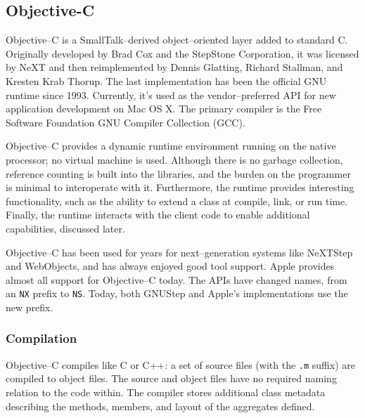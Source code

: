 \subsection{Objective-C}
	Objective--C\cite{objc} is a SmallTalk--derived object--oriented layer added to standard C.  Originally developed by Brad Cox and the StepStone Corporation\cite{dekorte}, it was licensed by NeXT and then reimplemented by Dennis Glatting, Richard Stallman, and Kresten Krab Thorup.  The last implementation has been the official GNU runtime since 1993\cite{dekorte}.  Currently, it's used as the vendor--preferred API for new application development on Mac OS X.  The primary compiler is the Free Software Foundation GNU Compiler Collection (GCC).

	Objective--C provides a dynamic runtime environment running on the native processor; no virtual machine is used.  Although there is no garbage collection, reference counting is built into the libraries, and the burden on the programmer is minimal to interoperate with it.  Furthermore, the runtime provides interesting functionality, such as the ability to extend a class at compile, link, or run time.  Finally, the runtime interacts with the client code to enable additional capabilities, discussed later.

	Objective--C has been used for years for next--generation systems like NeXTStep and WebObjects, and has always enjoyed good tool support.  Apple provides almost all support for Objective--C today.  The APIs have changed names, from an \texttt{NX} prefix to \texttt{NS}.  Today, both GNUStep\cite{gnustep} and Apple's implementations use the new prefix.

\subsubsection{Compilation}	

	Objective--C compiles like C or C++: a set of source files (with the \texttt{.m} suffix) are compiled to object files.  The source and object files have no required naming relation to the code within.  The compiler stores additional class metadata describing the methods, members, and layout of the aggregates defined.

